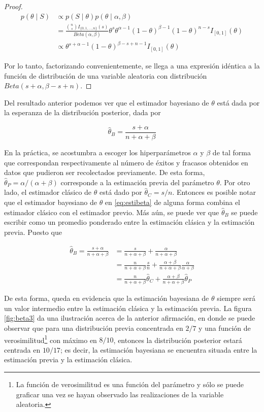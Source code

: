 \documentclass[
  spanish,
]{book}
\theoremstyle{definition}
\theoremstyle{definition}
\theoremstyle{definition}
\theoremstyle{definition}
\theoremstyle{remark}
\begin{document}
\begin{proof}
\iffalse{} {Prueba. } \fi{}\begin{align*}
p(\theta \mid S)&\propto p(S \mid \theta)p(\theta \mid \alpha,\beta)\\
&=\frac{\binom{n}{s}I_{\{0,1,\ldots,n\}}(s)}{Beta(\alpha,\beta)}
\theta^s\theta^{\alpha-1} (1-\theta)^{\beta-1}(1-\theta)^{n-s}I_{[0,1]}(\theta)\\
&\propto \theta^{s+\alpha-1} (1-\theta)^{\beta-s+n-1}I_{[0,1]}(\theta)
\end{align*}

Por lo tanto, factorizando convenientemente, se llega a una expresión idéntica a la función de distribución de una variable aleatoria con distribución \(Beta(s+\alpha,\beta-s+n)\).
\end{proof}

Del resultado anterior podemos ver que el estimador bayesiano de
\(\theta\) está dada por la esperanza de la distribución posterior, dada
por

\begin{equation}
\label{eq:estibeta}
\hat{\theta}_{B}=\frac{s+\alpha}{n+\alpha+\beta}
\end{equation}

En la práctica, se acostumbra a escoger los hiperparámetros \(\alpha\) y
\(\beta\) de tal forma que correspondan respectivamente al número de
éxitos y fracasos obtenidos en datos que pudieron ser recolectados
previamente. De esta forma, \(\hat{\theta}_{P}=\alpha/(\alpha+\beta)\)
corresponde a la estimación previa del parámetro \(\theta\). Por otro
lado, el estimador clásico de \(\theta\) está dado por
\(\hat{\theta}_{C}=s/n\). Entonces es posible notar que el estimador
bayesiano de \(\theta\) en \eqref{eq:estibeta} de alguna forma combina el
estimador clásico con el estimador previo. Más aún, se puede ver que
\(\hat{\theta}_{B}\) se puede escribir como un promedio ponderado entre la
estimación clásica y la estimación previa. Puesto que

\begin{align*}
\hat{\theta}_{B}=\frac{s+\alpha}{n+\alpha+\beta}&=\frac{s}{n+\alpha+\beta}+\frac{\alpha}{n+\alpha+\beta}\\
&=\frac{n}{n+\alpha+\beta}\frac{s}{n}+\frac{\alpha+\beta}{n+\alpha+\beta}\frac{\alpha}{\alpha+\beta}\\
&=\frac{n}{n+\alpha+\beta}\hat{\theta}_{C}+\frac{\alpha+\beta}{n+\alpha+\beta}\hat{\theta}_{P}
\end{align*}

De esta forma, queda en evidencia que la estimación bayesiana de
\(\theta\) siempre será un valor intermedio entre la estimación clásica y
la estimación previa. La figura \ref{fig:beta3} da una ilustración
acerca de la anterior afirmación, en donde se puede observar que para
una distribución previa concentrada en \(2/7\) y una función de
verosimilitud\footnote{La función de verosimilitud es una función del parámetro
  y sólo se puede graficar una vez se hayan observado las realizaciones de
  la variable aleatoria.} con máximo en \(8/10\), entonces la distribución
posterior estará centrada en \(10/17\); es decir, la estimación bayesiana
se encuentra situada entre la estimación previa y la estimación clásica.
\end{document}
